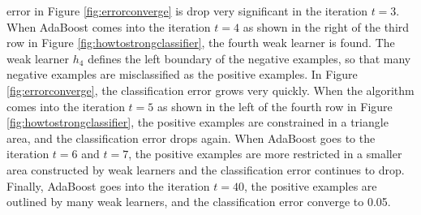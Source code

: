 error in \mbox{Figure} \ref{fig:errorconverge} is drop very significant in the iteration $t=3$. When AdaBoost comes into the iteration $t=4$ as shown in the right of the third row in \mbox{Figure} \ref{fig:howtostrongclassifier}, the fourth weak learner is found. The weak learner $h_{4}$ defines the left boundary of the negative examples, so that many negative examples are misclassified as the positive examples. In \mbox{Figure} \ref{fig:errorconverge}, the classification error grows very quickly. When the algorithm comes into the iteration $t=5$ as shown in the left of the fourth row in \mbox{Figure} \ref{fig:howtostrongclassifier}, the positive examples are constrained in a triangle area, and the classification error drops again. When AdaBoost goes to the iteration  $t=6$ and $t=7$, the positive examples are more restricted in a smaller area constructed by weak learners and the classification error continues to drop. Finally, AdaBoost goes into the iteration $t=40$, the positive examples are outlined by many weak learners, and the classification error converge to 0.05. 

